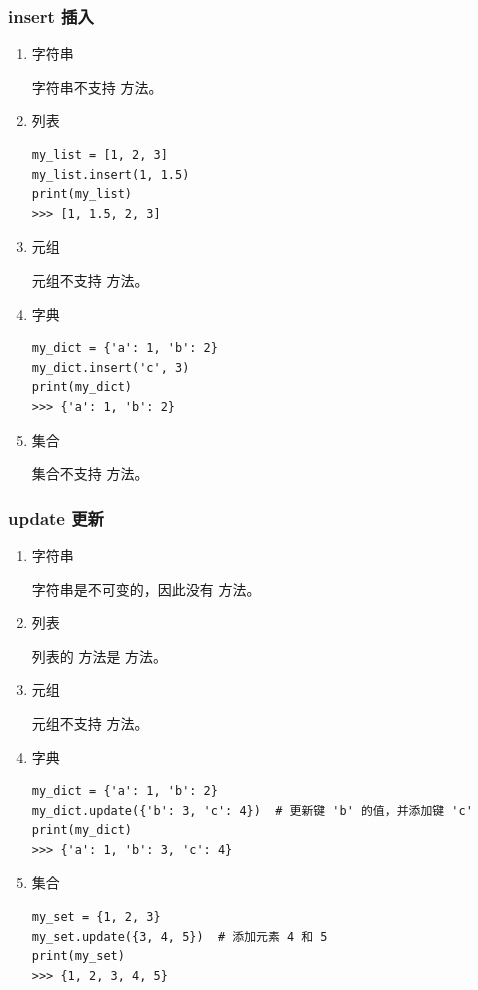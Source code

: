 \subsubsection{insert 插入}
\begin{enumerate}[label=\arabic*)]
    \item 字符串

    字符串不支持  方法。

    \item 列表

\begin{lstlisting}[style=demostyle,numbers=none]
my_list = [1, 2, 3]
my_list.insert(1, 1.5)
print(my_list)  
>>> [1, 1.5, 2, 3]
\end{lstlisting}

    \item 元组

    元组不支持  方法。

    \item 字典

\begin{lstlisting}[style=demostyle,numbers=none]
my_dict = {'a': 1, 'b': 2}
my_dict.insert('c', 3)
print(my_dict)  
>>> {'a': 1, 'b': 2}
\end{lstlisting}

    \item 集合

    集合不支持  方法。
\end{enumerate}

\subsubsection{update 更新}
\begin{enumerate}[label=\arabic*)]
    \item 字符串

    字符串是不可变的，因此没有  方法。

    \item 列表

    列表的  方法是  方法。

    \item 元组

    元组不支持  方法。

    \item 字典
\begin{lstlisting}[style=demostyle,numbers=none]
my_dict = {'a': 1, 'b': 2}
my_dict.update({'b': 3, 'c': 4})  # 更新键 'b' 的值，并添加键 'c'
print(my_dict) 
>>> {'a': 1, 'b': 3, 'c': 4}
\end{lstlisting}

    \item 集合

\begin{lstlisting}[style=demostyle,numbers=none]
my_set = {1, 2, 3}
my_set.update({3, 4, 5})  # 添加元素 4 和 5
print(my_set)  
>>> {1, 2, 3, 4, 5}
\end{lstlisting}
\end{enumerate}

